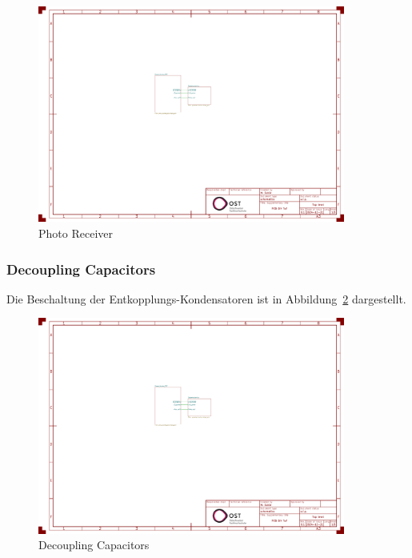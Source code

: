 \documentclass[11pt,a4paper,hidelinks]{article}
\begin{document}
\begin{figure}[H]
    \centering
    \includegraphics[page=3, trim=100 240 600 340, clip, width=0.9\textwidth]{attachments/schematic.pdf}
    \caption{Photo Receiver}\label{fig:photo_receiver}
\end{figure}

\subsubsection{Decoupling Capacitors}

Die Beschaltung der Entkopplungs-Kondensatoren ist in Abbildung~\ref{fig:decoupling_capacitors} dargestellt.

\begin{figure}[H]
    \centering
    \includegraphics[page=3, trim=100 60 650 630, clip, width=0.9\textwidth]{attachments/schematic.pdf}
    \caption{Decoupling Capacitors}\label{fig:decoupling_capacitors}
\end{figure}
\end{document}
